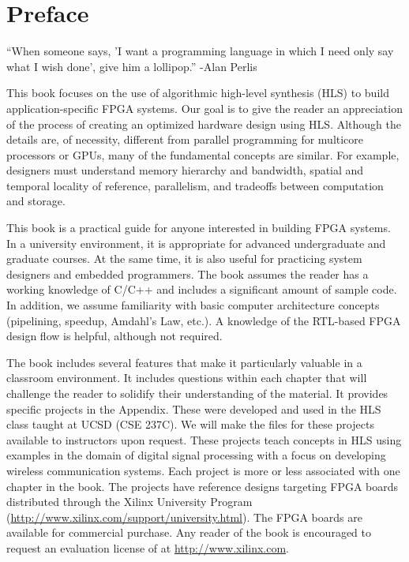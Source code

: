 
\chapter*{Preface}
\begin{aside}
``When someone says, 'I want a programming language in which I need only say what I wish done', give him a lollipop.'' -Alan Perlis
\end{aside}

This book focuses on the use of algorithmic high-level synthesis (HLS) to build application-specific FPGA systems.  Our goal is to give the reader an appreciation of the process of creating an optimized hardware design using HLS. Although the details are, of necessity, different from parallel programming for multicore processors or GPUs, many of the fundamental concepts are similar.  For example, designers must understand memory hierarchy and bandwidth, spatial and temporal locality of reference, parallelism, and tradeoffs between computation and storage.

This book is a practical guide for anyone interested in building FPGA systems.  In a university environment, it is appropriate for advanced undergraduate and graduate courses.  At the same time, it is also useful for practicing system designers and embedded programmers.  The book assumes the reader has a working knowledge of C/C++ and includes a significant amount of sample code. In addition, we assume familiarity with basic computer architecture concepts (pipelining, speedup, Amdahl's Law, etc.).  A knowledge of the RTL-based FPGA design flow is helpful, although not required.

The book includes several features that make it particularly valuable in a classroom environment.  It includes questions within each chapter that will challenge the reader to solidify their understanding of the material.  It provides specific projects in the Appendix. These were developed and used in the HLS class taught at UCSD (CSE 237C). We will make the files for these projects available to instructors upon request. These projects teach concepts in HLS using examples in the domain of digital signal processing with a focus on developing wireless communication systems. Each project is more or less associated with one chapter in the book. The projects have reference designs targeting FPGA boards distributed through the Xilinx University Program (\url{http://www.xilinx.com/support/university.html}).   The FPGA boards are available for commercial purchase.  Any reader of the book is encouraged to request an evaluation license of \VHLS at \url{http://www.xilinx.com}.

